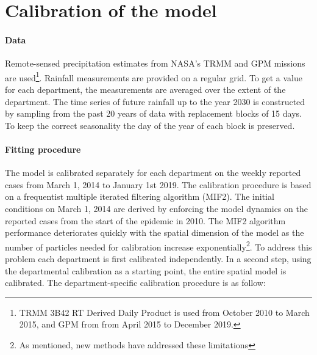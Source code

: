 \section{Calibration of the model}
\paragraph{Data} Remote-sensed precipitation estimates from NASA's TRMM and GPM missions are used\footnote{TRMM 3B42 RT Derived Daily Product \parencite{Huffman:TRMMMultisatellitePrecipitation:2007} is used from October 2010 to March 2015,  and GPM from from April 2015 to December 2019.}. Rainfall measurements are provided on a regular grid. To get a value for each department, the measurements are averaged over the extent of the department. The time series of future rainfall up to the year 2030 is constructed by sampling from the past 20 years of data  with replacement blocks of 15 days. To keep the correct seasonality the day of the year of each block is preserved.

\paragraph{Fitting procedure} The model is calibrated separately for each department on the weekly reported cases from March 1, 2014 to January 1st 2019. The calibration procedure is based on a frequentist multiple iterated filtering algorithm (MIF2)\cite{Ionides:InferenceDynamicLatent:2015}. The initial conditions on March 1, 2014 are derived by enforcing the model dynamics on the reported cases from the start of the epidemic in 2010. The MIF2 algorithm performance deteriorates quickly with the spatial dimension of the model as the number of particles needed for calibration increase exponentially\cite{Park:GuidedIntermediateResampling:2017}\footnote{As mentioned, new methods have addressed these limitations\parencite{Asfaw:PartiallyObservedMarkov:2021, Park:InferenceHighdimensionalImplicit:2020}}. To address this problem each department is first calibrated independently. In a second step, using the departmental calibration as a starting point, the entire spatial model is calibrated.
The department-specific calibration procedure is as follow:

